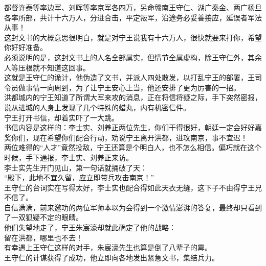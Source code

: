 \begin{multicols}{\theparacolNo}
都督许泰等率边军、刘晖等率京军各四万，另命赣南王守仁、湖广秦金、两广杨旦各率所部，共计十六万人，分进合击，平定叛军，沿途务必妥善接应，延误者军法从事！\\

这封文书的大概意思很明白，就是对宁王说我有十六万人，很快就要来打你，希望你好好准备。\\

必须说明的是，这封文书上的人名全部属实，但情节全属虚构，除王守仁外，其余人等压根就不知道这回事。\\

这就是王守仁的诡计，他伪造了文书，并派人四处散发，以打乱宁王的部署，王司令员做事情一向周到，为了让宁王安心上当，他还安排了更为厉害的一招。\\

洪都城内的宁王知道了所谓大军来攻的消息，正在将信将疑之际，手下突然密报，说从进城的人身上发现了几个特殊的蜡丸，内有机密信件。\\

宁王打开书信，却着实吓了一大跳。\\

书信内容是这样的：李士实、刘养正两位先生，你们干得很好，朝廷一定会好好嘉奖你们，现在希望你们配合行动，劝说宁王离开洪都，进攻南京，事不宜迟！\\

两位难得的“人才”竟然投敌，宁王还算是个明白人，也不怎么相信。偏巧就在这个时候，手下通报，李士实、刘养正来访。\\

李士实先生开门见山，第一句话就捅破了天：\\

“殿下，此地不宜久留，应立即带兵攻击南京！”\\

王守仁的台词实在写得太好，李士实也配合得如此天衣无缝，这下子不由得宁王兄不信了。\\

自信满满，前来邀功的两位军师本以为会得到一个激情澎湃的答复，最终却只看到了一双狐疑不定的眼睛。\\

他们失望地走了，宁王朱宸濠却就此确定了他的战略：\\

留在洪都，哪里也不去！\\

有幸遇上王守仁这样的对手，朱宸濠先生也算是倒了八辈子的霉。\\

王守仁的计谋获得了成功，他立即向各地发出紧急文书，集结兵力。\\


\end{multicols}

